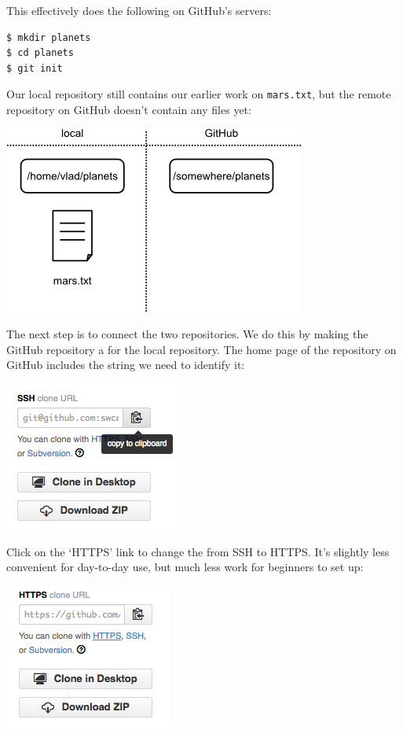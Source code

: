 \documentclass{book}
\begin{document}
This effectively does the following on GitHub's servers:

\begin{verbatim}
$ mkdir planets
$ cd planets
$ git init
\end{verbatim}

Our local repository still contains our earlier work on
\texttt{mars.txt}, but the remote repository on GitHub doesn't contain
any files yet:

\includegraphics{novice/git/img/git-freshly-made-github-repo.png}

The next step is to connect the two repositories. We do this by making
the GitHub repository a  for the
local repository. The home page of the repository on GitHub includes the
string we need to identify it:

\includegraphics{novice/git/img/github-find-repo-string.png}

Click on the `HTTPS' link to change the 
from SSH to HTTPS. It's slightly less convenient for day-to-day use, but
much less work for beginners to set up:

\includegraphics{novice/git/img/github-change-repo-string.png}
\end{document}
